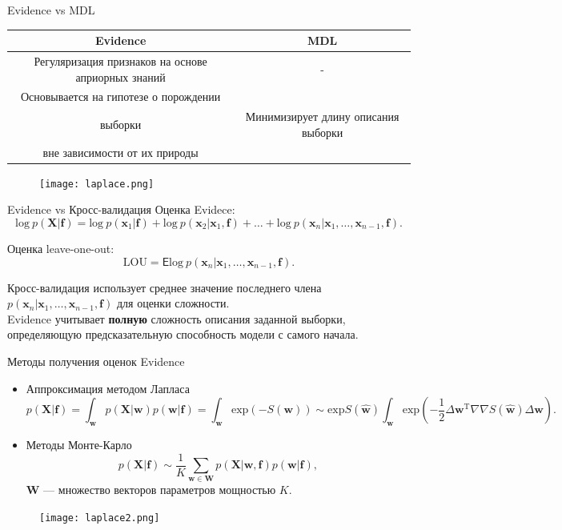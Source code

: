 \documentclass[10pt,pdf,utf8,russian,aspectratio=169]{beamer}
\begin{document}
\begin{frame}{Evidence vs MDL}
\begin{tabular}{ c | c  }
  \hline			
  Evidence & MDL \\
  \hline  
Регуляризация признаков на основе априорных знаний &  - \\
  \hline  
Основывается на гипотезе о порождении\\ выборки & Минимизирует длину описания выборки\\ вне зависимости от их природы \\
  \hline  

\end{tabular}


\begin{figure}
  \centering
 \texttt{[image: laplace.png]}
\label{fig:1}\qquad

\end{figure}
\end{frame}

\begin{frame}{Evidence vs Кросс-валидация}
Оценка Evidece:
\[
\text{log}~p(\mathbf{X}|\mathbf{f}) = \text{log}~p(\mathbf{x}_1|\mathbf{f}) + \text{log}~p(\mathbf{x}_2|\mathbf{x}_1, \mathbf{f}) + \dots +  \text{log}~p(\mathbf{x}_n|\mathbf{x}_1,\dots,\mathbf{x}_{n-1}, \mathbf{f}).
\]

Оценка leave-one-out:
\[
\text{LOU} = \mathsf{E} \text{log}~p(\mathbf{x}_n|\mathbf{x}_1,\dots,\mathbf{x}_{n-1}, \mathbf{f}).
\]

Кросс-валидация использует среднее значение последнего члена $p(\mathbf{x}_n|\mathbf{x}_1,\dots,\mathbf{x}_{n-1}, \mathbf{f})$ для оценки сложности. \\
Evidence учитывает \textbf{полную} сложность описания заданной выборки, определяющую предсказательную способность модели с самого начала.
\end{frame}

\begin{frame}{Методы получения оценок Evidence}
\begin{itemize}
\item{Аппроксимация методом Лапласа}\\
$$
	p(\mathbf{X}|\mathbf{f}) = \int_\mathbf{w} p(\mathbf{X}|\mathbf{w}) p(\mathbf{w}|\mathbf{f}) = \int_\mathbf{w} \text{exp}(-S(\mathbf{w}))	\sim  \text{exp}S(\hat{\mathbf{w}}) \int_\mathbf{w} \text{exp} (-\frac{1}{2}\Delta \mathbf{w}^\text{T} \nabla \nabla S(\hat{\mathbf{w}}) \Delta \mathbf{w} ).
$$

\item {Методы Монте-Карло}
$$
p(\mathbf{X}|\mathbf{f})  \sim \frac{1}{K}\sum_{\mathbf{w} \in \mathbf{W}} p(\mathbf{X}|\mathbf{w},\mathbf{f})p(\mathbf{w}|\mathbf{f}),
$$
$\mathbf{W}$ --- множество векторов параметров мощностью $K$.
\end{itemize}
\begin{figure}
  \centering
 \texttt{[image: laplace2.png]}
\label{fig:1}\qquad	
\end{figure}
\end{frame}
\end{document}

